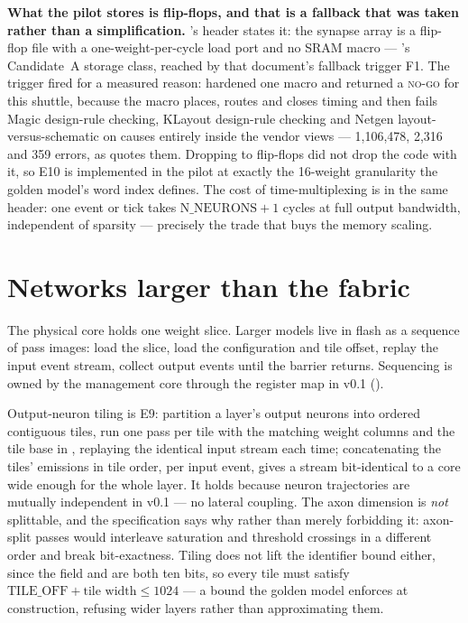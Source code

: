 \textbf{What the pilot stores is flip-flops, and that is a fallback
that was taken rather than a simplification.}
's header states it: the synapse array is a
flip-flop file with a one-weight-per-cycle load port and no SRAM macro
--- 's Candidate~A storage class, reached by that
document's fallback trigger F1. The trigger fired for a measured
reason:  hardened one 
macro \cite{ihppdk} and returned a \textsc{no-go} for this shuttle, because the macro
places, routes and closes timing and then fails Magic design-rule
checking, KLayout design-rule checking and Netgen
layout-versus-schematic on causes entirely inside the vendor views ---
1,106,478, 2,316 and 359 errors, as  quotes them.
Dropping to flip-flops did not drop the code with it, so E10 is
implemented in the pilot at exactly the 16-weight granularity the
golden model's word index defines. The cost of time-multiplexing is in
the same header: one event or tick takes $\mathrm{N\_NEURONS}+1$ cycles
at full output bandwidth, independent of sparsity --- precisely the
trade that buys the memory scaling.

\section{Networks larger than the fabric}

The physical core holds one weight slice. Larger models live in flash
as a sequence of pass images: load the slice, load the configuration
and tile offset, replay the input event stream, collect output events
until the barrier returns. Sequencing is owned by the management core
through the register map in v0.1 ().

Output-neuron tiling is E9: partition a layer's output neurons into
ordered contiguous tiles, run one pass per tile with the matching
weight columns and the tile base in , replaying
the identical input stream each time; concatenating the tiles'
emissions in tile order, per input event, gives a stream bit-identical
to a core wide enough for the whole layer. It holds because neuron
trajectories are mutually independent in v0.1 --- no lateral coupling.
The axon dimension is \emph{not} splittable, and the specification says
why rather than merely forbidding it: axon-split passes would
interleave saturation and threshold crossings in a different order and
break bit-exactness. Tiling does not lift the identifier bound either,
since the  field and  are both ten bits,
so every tile must satisfy
$\mathrm{TILE\_OFF} + \text{tile width} \leq 1024$ --- a bound the
golden model enforces at construction, refusing wider layers rather
than approximating them.


